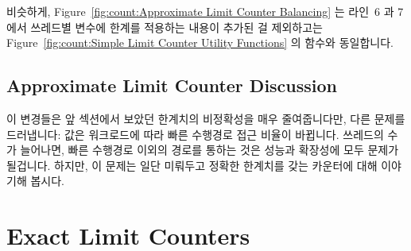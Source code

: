 비슷하게,
Figure~\ref{fig:count:Approximate Limit Counter Balancing} 는 라인~6 과 7 에서
쓰레드별  변수에  한계를 적용하는 내용이
추가된 걸 제외하고는
Figure~\ref{fig:count:Simple Limit Counter Utility Functions} 의
 함수와 동일합니다.

\subsection{Approximate Limit Counter Discussion}

이 변경들은 앞 섹션에서 보았던 한계치의 비정확성을 매우 줄여줍니다만, 다른
문제를 드러냅니다:  값은 워크로드에 따라 빠른 수행경로 접근
비율이 바뀝니다.
쓰레드의 수가 늘어나면, 빠른 수행경로 이외의 경로를 통하는 것은 성능과 확장성에
모두 문제가 될겁니다.
하지만, 이 문제는 일단 미뤄두고 정확한 한계치를 갖는 카운터에 대해 이야기해
봅시다.

\section{Exact Limit Counters}
\label{sec:count:Exact Limit Counters}

